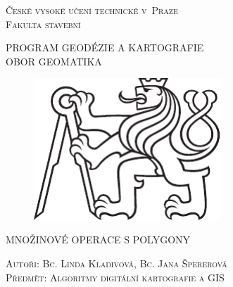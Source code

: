 \documentclass[a4paper,11pt,twoside]{article}
\def\author{Autoři: Bc. Linda Kladivová, Bc. Jana Špererová}
\def\nazevprace{MNOŽINOVÉ OPERACE S POLYGONY}
\begin{document}
\setcounter{page}{1}  %
\sloppy
\setlength{\parskip}{1pt}



\pagestyle{empty} %

\begin{center}
\renewcommand{\baselinestretch}{1.4} %

\LARGE
\textsc{České vysoké učení technické v~Praze} \\
\textsc{Fakulta stavební} \\

\bigskip

\large
\textsc{PROGRAM GEODÉZIE A KARTOGRAFIE} \\
\textsc{OBOR GEOMATIKA} \\

\vspace{10ex}

\begin{figure}[hbt!] %
\begin{center}
\includegraphics[width=7cm]{pictures/symbol_cvut_konturova_verze_cb.pdf} 
\end{center}
\end{figure}

\vspace{20ex}

\large
\textsc{\nazevprace} \\
\smallskip


\vspace{6ex}

\normalsize
\textsc{\author} \\
\bigskip
\normalsize
\textsc{Předmět: Algoritmy digitální kartografie a GIS} \\

\end{center}



\end{document}
